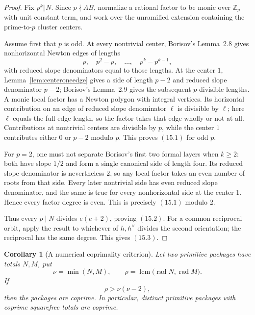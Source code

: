\documentclass[11pt]{article}
\newtheorem{corollary}[theorem]{Corollary}
\theoremstyle{definition}
\newcommand{\Z}{\mathbb Z}
\begin{document}
\begin{proof}
Fix \(p^k\Vert N\).  Since \(p\nmid AB\), normalize a rational factor to
be monic over \(\Z_p\) with unit constant term, and work over the unramified
extension containing the prime-to-\(p\) cluster centers.

Assume first that \(p\) is odd.  At every nontrivial center, Borisov's
Lemma~2.8 gives nonhorizontal Newton edges of lengths
\[
 p,\quad p^2-p,\quad\ldots,\quad p^k-p^{k-1},
\]
with reduced slope denominators equal to those lengths.  At the center
\(1\), Lemma~\ref{lem:centeroneedge} gives a side of length \(p-2\) and
reduced slope denominator \(p-2\); Borisov's Lemma~2.9 gives the subsequent
\(p\)-divisible lengths.  A monic local
factor has a Newton polygon with integral vertices.  Its horizontal
contribution on an edge of reduced slope denominator \(\ell\) is divisible
by \(\ell\); here \(\ell\) equals the full edge length, so the factor takes
that edge wholly or not at all.  Contributions at nontrivial centers are
divisible by \(p\), while the center \(1\) contributes either \(0\) or
\(p-2\) modulo \(p\).  This proves \((15.1)\) for odd \(p\).

For \(p=2\), one must not separate Borisov's first two formal layers when
\(k\geq2\): both have slope \(1/2\) and form a single canonical side of
length four.  Its reduced slope denominator is nevertheless \(2\), so any
local factor takes an even number of roots from that side.  Every later
nontrivial side has even reduced slope denominator, and the same is true for
every nonhorizontal side at the center \(1\).  Hence every factor degree is
even.  This is precisely \((15.1)\) modulo \(2\).

Thus every \(p\mid N\) divides \(e(e+2)\), proving \((15.2)\).  For a
common reciprocal orbit, apply the result to whichever of \(h,h^\vee\)
divides the second orientation; the reciprocal has the same degree.  This
gives \((15.3)\).
\end{proof}

\begin{corollary}[A numerical coprimality criterion]
\label{cor:radicalcriterion}
Let two primitive packages have totals \(N,M\), put
\[
 \nu=\min(N,M),\qquad
 \rho=\operatorname{lcm}\bigl(\operatorname{rad}N,
                                \operatorname{rad}M\bigr).
\]
If
\begin{equation}
 \rho>\nu(\nu-2),
 \tag{15.4}
\end{equation}
then the packages are coprime.  In particular, distinct primitive packages
with coprime squarefree totals are coprime.
\end{corollary}
\end{document}
